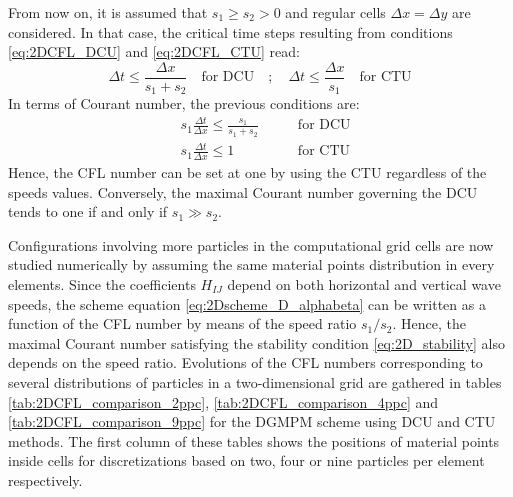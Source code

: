 From now on, it is assumed that $s_1\geq s_2 >0$ and regular cells $\Delta x = \Delta y$ are considered.
In that case, the critical time steps resulting from conditions \eqref{eq:2DCFL_DCU} and \eqref{eq:2DCFL_CTU} read:
\begin{equation}
  \Delta t \leq \frac{\Delta x}{s_1+s_2} \quad \text{for DCU} \quad;\quad \Delta t \leq \frac{\Delta x}{s_1} \quad \text{for CTU}
\end{equation}
In terms of Courant number, the previous conditions are:
\begin{subequations}
  \begin{alignat}{2}
    \label{eq:2D_CFL_DCU}
    & s_1\frac{\Delta t}{\Delta x} \leq \frac{s_1}{s_1+s_2} \qquad &\text{for DCU} \\
    \label{eq:2D_CFL_CTU}
    & s_1\frac{\Delta t}{\Delta x} \leq 1 \qquad &\text{for CTU}
  \end{alignat}
\end{subequations}
Hence, the CFL number can be set at one by using the CTU regardless of the speeds values.
Conversely, the maximal Courant number governing the DCU tends to one if and only if $s_1 \gg s_2$.


Configurations involving more particles in the computational grid cells are now studied numerically by assuming the same material points distribution in every elements.
Since the coefficients $H_{I J}$ depend on both horizontal and vertical wave speeds, the scheme equation \eqref{eq:2Dscheme_D_alphabeta} can be written as a function of the CFL number by means of the speed ratio  $s_1/s_2$.
Hence, the maximal Courant number satisfying the stability condition \eqref{eq:2D_stability} also depends on the speed ratio.
Evolutions of the CFL numbers corresponding to several distributions of particles in a two-dimensional grid are gathered in tables \ref{tab:2DCFL_comparison_2ppc}, \ref{tab:2DCFL_comparison_4ppc} and \ref{tab:2DCFL_comparison_9ppc} for the DGMPM scheme using DCU and CTU methods.
The first column of these tables shows the positions of material points inside cells for discretizations based on two, four or nine particles per element respectively. 

